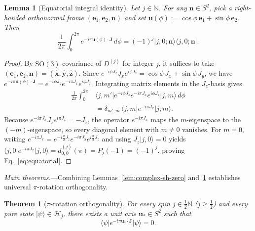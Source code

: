 \documentclass[aps,prl,reprint,amsmath,amssymb,nofootinbib,floatfix]{revtex4-2}
\newtheorem{theorem}{Theorem}
\newtheorem{lemma}{Lemma}
\newcommand{\ket}[1]{\lvert #1 \rangle}
\newcommand{\bra}[1]{\langle #1 \rvert}
\newcommand{\bn}{\mathbf{n}}
\newcommand{\bu}{\mathbf{u}}
\newcommand{\bJ}{\mathbf{J}}
\newcommand{\be}{\mathbf{e}}
\begin{document}
\begin{lemma}[Equatorial integral identity]\label{lem:equatorial}
Let $j \in \mathbb{N}$. For any $\bn \in S^2$, pick a right-handed orthonormal frame $(\be_1, \be_2, \bn)$ and set $\bu(\phi) := \cos\phi\,\be_1 + \sin\phi\,\be_2$. Then
\begin{equation}\label{eq:equatorial}
\frac{1}{2\pi}\int_{0}^{2\pi} e^{-i\pi \bu(\phi)\cdot\bJ}\,d\phi = (-1)^j \ket{j,0;\bn}\bra{j,0;\bn}.
\end{equation}
\end{lemma}

\begin{proof}
By $\mathrm{SO}(3)$-covariance of $D^{(j)}$ for integer $j$, it suffices to take $(\be_1, \be_2, \bn) = (\hat{\mathbf{x}}, \hat{\mathbf{y}}, \hat{\mathbf{z}})$. Since $e^{-i\phi J_z} J_x e^{i\phi J_z} = \cos\phi\,J_x + \sin\phi\,J_y$, we have $e^{-i\pi\bu(\phi)\cdot\bJ} = e^{-i\phi J_z} e^{-i\pi J_x} e^{i\phi J_z}$. Integrating matrix elements in the $J_z$-basis gives
\begin{align}
\frac{1}{2\pi}\int_{0}^{2\pi} &\bra{j,m'} e^{-i\phi J_z} e^{-i\pi J_x} e^{i\phi J_z} \ket{j,m}\,d\phi \nonumber\\
&= \delta_{m',m}\,\bra{j,m} e^{-i\pi J_x} \ket{j,m}.
\end{align}
Because $e^{-i\pi J_x} J_z e^{i\pi J_x} = -J_z$, the operator $e^{-i\pi J_x}$ maps the $m$-eigenspace to the $(-m)$-eigenspace, so every diagonal element with $m \neq 0$ vanishes. For $m = 0$, writing $e^{-i\pi J_x} = e^{-i\frac{\pi}{2}J_z} e^{-i\pi J_y} e^{i\frac{\pi}{2}J_z}$ and using $J_z\ket{j,0}=0$ yields $\bra{j,0}e^{-i\pi J_x}\ket{j,0} = d^{(j)}_{0,0}(\pi) = P_j(-1) = (-1)^j$, proving Eq.~\eqref{eq:equatorial}.
\end{proof}

\emph{Main theorems.}---Combining Lemmas~\ref{lem:complex-sh-zero} and~\ref{lem:equatorial} establishes universal $\pi$-rotation orthogonality.

\begin{theorem}[$\pi$-rotation orthogonality]\label{thm:pi-ortho}
For every spin $j \in \frac{1}{2}\mathbb{N}$ ($j \ge \frac{1}{2}$) and every pure state $\ket{\psi} \in \mathcal{H}_j$, there exists a unit axis $\bu_* \in S^2$ such that
\begin{equation}\label{eq:pi-ortho}
\bra{\psi} e^{-i\pi \bu_* \cdot \bJ} \ket{\psi} = 0.
\end{equation}
\end{theorem}
\end{document}
